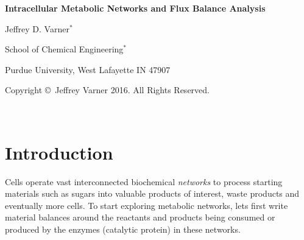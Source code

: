 \documentclass[11pt]{article}
\theoremstyle{definition}
\begin{document}
{\par\centering\textbf{\Large Intracellular Metabolic Networks and Flux Balance Analysis}}
\vspace{0.2in}
{\par \centering \large{Jeffrey D. Varner$^{*}$}}
\vspace{0.05in}
{\par \centering \large{School of Chemical Engineering$^{*}$}}
{\par \centering \large{Purdue University, West Lafayette IN 47907}}
\vspace{0.1in}
{\par \centering \small{Copyright \copyright\ Jeffrey Varner 2016. All Rights Reserved.}}\\

\date{}
\thispagestyle{empty}

\setcounter{page}{1}



\section*{Introduction}
Cells operate vast interconnected biochemical \textit{networks} to process starting materials such as sugars into valuable products of interest, waste products and eventually more cells.
To start exploring metabolic networks, lets first write material balances
around the reactants and products being consumed or produced by the enzymes (catalytic protein) in these networks.
\end{document}
